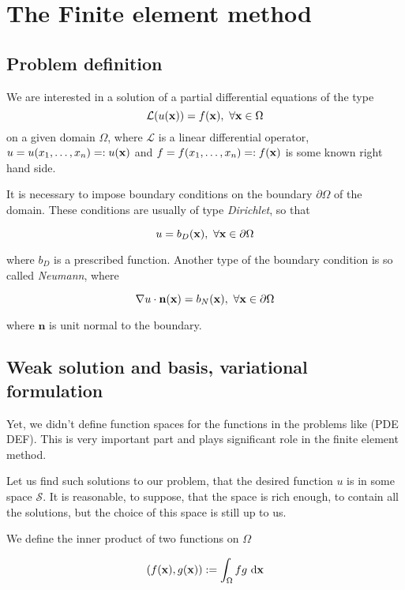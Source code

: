 \chapter{The Finite element method}

\section{Problem definition}

\par We are interested in a solution of a partial differential equations of the type 
$$\mathcal{L}(u(\mathbf{x})) = f(\mathbf{x}),~\forall \mathbf{x}\in\Omega$$
on a given domain $\Omega$, where $\mathcal{L}$ is a linear differential operator, 
$u = u(x_1,\ldots,x_n)=: u(\mathbf{x})$
and
$f = f(x_1,\ldots,x_n) =: f(\mathbf{x})$
is some known right hand side.

\par It is necessary to impose boundary conditions on the boundary $\partial\Omega$ of the domain. These conditions are usually of type \textit{Dirichlet}, so that

$$ u = b_D(\mathbf{x}),~\forall \mathbf{x} \in \partial\Omega $$

where $b_D$ is a prescribed function. Another type of the boundary condition is so called \textit{Neumann}, where

$$ \nabla u \cdot \mathbf{n}(\mathbf{x}) = b_N(\mathbf{x}),~\forall \mathbf{x}\in\partial\Omega $$

where $\mathbf{n}$ is unit normal to the boundary.

\section{Weak solution and basis, variational formulation}

\par Yet, we didn't define function spaces for the functions in the problems like (PDE DEF). 
This is very important part and plays significant role in the finite element method.
\par Let us find such solutions to our problem, that the desired function $u$ is in some space $\mathcal{S}$.
It is reasonable, to suppose, that the space is rich enough, to contain all the solutions, but the choice of this space is still up to us. 
\par We define the inner product of two functions on $\Omega$ 

$$ (f(\mathbf{x}), g(\mathbf{x})) := \int_\Omega fg ~\mathrm{d\mathbf{x}} $$

